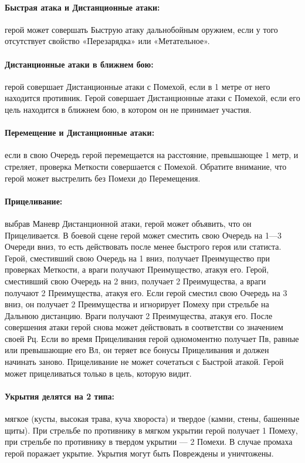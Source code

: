 \paragraph{Быстрая атака и Дистанционные атаки:} герой может совершать Быструю атаку дальнобойным оружием, если у того отсутствует свойство «Перезарядка» или «Метательное».
\paragraph{Дистанционные атаки в ближнем бою:} герой совершает Дистанционные атаки с Помехой, если в 1 метре от него находится противник. Герой совершает Дистанционные атаки с Помехой, если его цель находится в ближнем бою, в котором он не принимает участия.
\paragraph{Перемещение и Дистанционные атаки:} если в свою Очередь герой перемещается на расстояние, превышающее 1 метр, и стреляет, проверка Меткости совершается с Помехой. Обратите внимание, что герой может выстрелить без Помехи до Перемещения.
\paragraph{Прицеливание:} выбрав Маневр Дистанционной атаки, герой может объявить, что он Прицеливается. В боевой сцене герой может сместить свою Очередь на 1—3 Очереди вниз, то есть действовать после менее быстрого героя или статиста. Герой, сместивший свою Очередь на 1 вниз, получает Преимущество при проверках Меткости, а враги получают Преимущество, атакуя его. Герой, сместивший свою Очередь на 2 вниз, получает 2 Преимущества, а враги получают 2 Преимущества, атакуя его. Если герой сместил свою Очередь на 3 вниз, он получает 2 Преимущества и игнорирует Помеху при стрельбе на Дальнюю дистанцию. Враги получают 2 Преимущества, атакуя его. После совершения атаки герой снова может действовать в соответстви со значением своей Рц.
\newline
Если во время Прицеливания герой одномоментно получает Пв, равные или превышающие его Вл, он теряет все бонусы Прицеливания и должен начинать заново. Прицеливание не может сочетаться с Быстрой атакой. Герой может прицеливаться только в цель, которую видит.
\paragraph{Укрытия делятся на 2 типа:} мягкое (кусты, высокая трава, куча хвороста) и твердое (камни, стены, башенные щиты). При стрельбе по противнику в мягком укрытии герой получает 1 Помеху, при стрельбе по противнику в твердом укрытии — 2 Помехи. В случае промаха герой поражает укрытие. Укрытия могут быть Повреждены и уничтожены.
